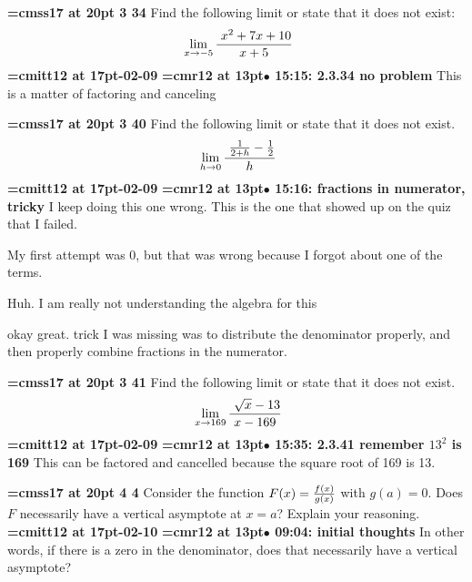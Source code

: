 {\medskip\noindent\bf\font\titlefont=cmss17 at 20pt 3 34}\medskip
Find the following limit or state that it does not exist:
$$\
\lim_{x \to -5} {\
{x^2 + 7x + 10}
\over
{x + 5}
}
$$
{\medskip\noindent\bf\font\titlefont=cmitt12 at 17pt-02-09}\medskip
{\smallskip\noindent\bf\font\titlefont=cmr12 at 13pt\titlefont $\bullet$ 15:15: 2.3.34 no problem}\smallskip
This is a matter of factoring and canceling
\par

{\medskip\noindent\bf\font\titlefont=cmss17 at 20pt 3 40}\medskip
Find the following limit or state that it does
not exist.
$$\
\lim_{h \to 0} {\
{{1 \over 2 + h} - {1 \over 2}} \over h
}
$$
{\medskip\noindent\bf\font\titlefont=cmitt12 at 17pt-02-09}\medskip
{\smallskip\noindent\bf\font\titlefont=cmr12 at 13pt\titlefont $\bullet$ 15:16: fractions in numerator, tricky}\smallskip
I keep doing this one wrong. This is the one that showed up on the quiz that I failed.
\par

My first attempt was 0, but that was wrong because I forgot about one of the terms.
\par

Huh. I am really not understanding the algebra for this
\par

okay great. trick I was missing was to distribute the denominator properly, and then properly combine fractions in the numerator.
\par

{\medskip\noindent\bf\font\titlefont=cmss17 at 20pt\titlefont 2 3 41}\medskip
Find the following limit or state that it does not exist.
$$\
\lim_{x \to 169} {\
{\sqrt{x} - 13}
\over
{x - 169}
}
$$
{\medskip\noindent\bf\font\titlefont=cmitt12 at 17pt-02-09}\medskip
{\smallskip\noindent\bf\font\titlefont=cmr12 at 13pt\titlefont $\bullet$ 15:35: 2.3.41 remember $13^2$ is 169}\smallskip
This can be factored and cancelled because the square root of 169 is 13.
\par

{\medskip\noindent\bf\font\titlefont=cmss17 at 20pt\titlefont 2 4 4}\medskip
Consider the function $F(x) = {f(x) \over g(x)}$ with $g(a) = 0$.
Does $F$ necessarily have a vertical asymptote at $x = a$?
Explain your reasoning.
{\medskip\noindent\bf\font\titlefont=cmitt12 at 17pt-02-10}\medskip
{\smallskip\noindent\bf\font\titlefont=cmr12 at 13pt\titlefont $\bullet$ 09:04: initial thoughts}\smallskip
In other words, if there is a zero in the denominator, does that necessarily have a vertical asymptote?
\par


